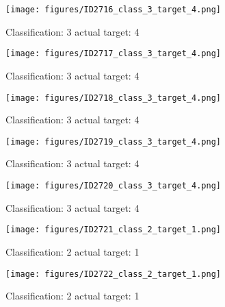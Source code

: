 \begin{figure}[h!]
\begin{center}
\texttt{[image: figures/ID2716\_class\_3\_target\_4.png]}
\end{center}
\caption{ Classification: 3 actual target: 4}
\label{fig:ID2716_class_3_target_4}
\end{figure}
\begin{figure}[h!]
\begin{center}
\texttt{[image: figures/ID2717\_class\_3\_target\_4.png]}
\end{center}
\caption{ Classification: 3 actual target: 4}
\label{fig:ID2717_class_3_target_4}
\end{figure}
\begin{figure}[h!]
\begin{center}
\texttt{[image: figures/ID2718\_class\_3\_target\_4.png]}
\end{center}
\caption{ Classification: 3 actual target: 4}
\label{fig:ID2718_class_3_target_4}
\end{figure}
\begin{figure}[h!]
\begin{center}
\texttt{[image: figures/ID2719\_class\_3\_target\_4.png]}
\end{center}
\caption{ Classification: 3 actual target: 4}
\label{fig:ID2719_class_3_target_4}
\end{figure}
\begin{figure}[h!]
\begin{center}
\texttt{[image: figures/ID2720\_class\_3\_target\_4.png]}
\end{center}
\caption{ Classification: 3 actual target: 4}
\label{fig:ID2720_class_3_target_4}
\end{figure}
\begin{figure}[h!]
\begin{center}
\texttt{[image: figures/ID2721\_class\_2\_target\_1.png]}
\end{center}
\caption{ Classification: 2 actual target: 1}
\label{fig:ID2721_class_2_target_1}
\end{figure}
\begin{figure}[h!]
\begin{center}
\texttt{[image: figures/ID2722\_class\_2\_target\_1.png]}
\end{center}
\caption{ Classification: 2 actual target: 1}
\label{fig:ID2722_class_2_target_1}
\end{figure}
